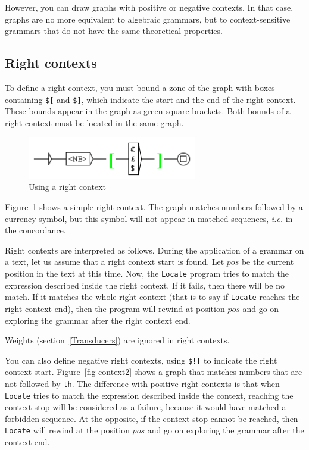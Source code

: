\bigskip
\noindent However, you can draw graphs with positive or negative contexts. In
that case, graphs are no more equivalent to algebraic grammars, but to context-sensitive
grammars that do not have the same theoretical properties.

\subsection{Right contexts}
\index{\verbc{$[}}
\index{\verbc{$]}}
To define a right context, you must bound a zone of the graph with boxes
containing \verb+$[+ and \verb+$]+, which indicate the start and the end of the
right context. These bounds appear in the graph as green square brackets. Both
bounds of a right context must be located in the same graph.

\bigskip
\begin{figure}[!h]
\begin{center}
\includegraphics[width=7.4cm]{resources/img/fig6-12.png}
\caption{Using a right context\label{fig-context1}}
\end{center}
\end{figure}

\bigskip
\noindent Figure~\ref{fig-context1} shows a simple right context. The graph
matches numbers followed by a currency symbol, but this symbol will not appear in
matched sequences, \textit{i.e.} in the concordance.

\bigskip
\noindent Right contexts are interpreted as follows. During the application of a
grammar on a text, let us assume that a right context start is found. Let $pos$ be the
current position in the text at this time. Now, the \verb$Locate$ program tries to match
the expression described inside the right context. If it fails, then there will
be no match. If it matches the whole right context (that is to say if
\verb$Locate$ reaches the right context end), then the program will rewind at
position $pos$ and go on exploring the grammar after the right context
end.

\bigskip
\noindent Weights (section~\ref{Transducers}) are ignored in right contexts.

\bigskip
\noindent You can also define negative right contexts,
using \verb+$![+ to indicate the right context start. Figure~\ref{fig-context2}
shows a graph that matches numbers that are not followed by \verb+th+. The difference
with positive right contexts is that when \verb$Locate$ tries to match the
expression described inside the context, reaching the context stop will be
considered as a failure, because it would have matched a forbidden sequence. At the opposite, if
the context stop cannot be reached, then \verb$Locate$ will rewind at the
position $pos$ and go on exploring the grammar after the context end.

